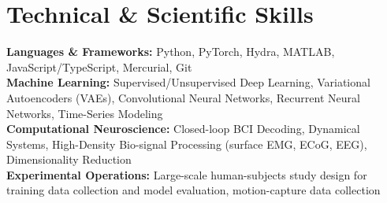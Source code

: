 
\section{Technical \& Scientific Skills}
\begin{itemize}[leftmargin=0.15in, label={}]
  \small{
    \item{
      \textbf{Languages \& Frameworks:}{ Python, PyTorch, Hydra, MATLAB, JavaScript/TypeScript, Mercurial, Git} \\ \vspace{2pt}
      \textbf{Machine Learning:}{ Supervised/Unsupervised Deep Learning, Variational Autoencoders (VAEs), Convolutional Neural Networks, Recurrent Neural Networks, Time-Series Modeling} \\ \vspace{2pt}
      \textbf{Computational Neuroscience:}{ Closed-loop BCI Decoding, Dynamical Systems, High-Density Bio-signal Processing (surface EMG, ECoG, EEG), Dimensionality Reduction} \\ \vspace{2pt}
      \textbf{Experimental Operations:}{ Large-scale human-subjects study design for training data collection and model evaluation, motion-capture data collection}
    }
  }
\end{itemize}
